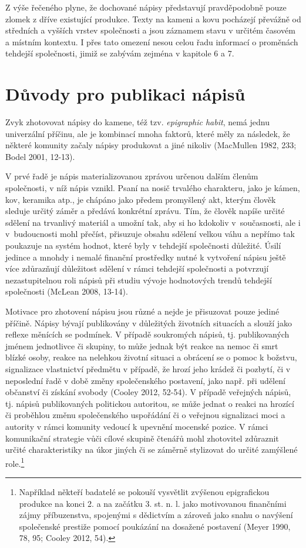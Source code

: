 Z výše řečeného plyne, že dochované nápisy představují pravděpodobně pouze zlomek z dříve existující produkce. Texty na kameni a kovu pocházejí převážně od středních a vyšších vrstev společnosti a jsou záznamem stavu v určitém časovém a místním kontextu. I přes tato omezení nesou celou řadu informací o proměnách tehdejší společnosti, jimiž se zabývám zejména v kapitole 6 a 7.

\section[důvody-pro-publikaci-nápisů]{Důvody pro publikaci nápisů}

Zvyk zhotovovat nápisy do kamene, též tzv. {\em epigraphic habit}, nemá jednu univerzální příčinu, ale je kombinací mnoha faktorů, které měly za následek, že některé komunity začaly nápisy produkovat a jiné nikoliv (MacMullen 1982, 233; Bodel 2001, 12-13).

V prvé řadě je nápis materializovanou zprávou určenou dalším členům společnosti, v níž nápis vznikl. Psaní na nosič trvalého charakteru, jako je kámen, kov, keramika atp., je chápáno jako předem promyšlený akt, kterým člověk sleduje určitý záměr a předává konkrétní zprávu. Tím, že člověk napíše určité sdělení na trvanlivý materiál a umožní tak, aby si ho kdokoliv v~současnosti, ale i v~budoucnosti mohl přečíst, přisuzuje obsahu sdělení velkou váhu a nepřímo tak poukazuje na systém hodnot, které byly v tehdejší společnosti důležité. Úsilí jedince a mnohdy i nemalé finanční prostředky nutné k vytvoření nápisu ještě více zdůrazňují důležitost sdělení v rámci tehdejší společnosti a potvrzují nezastupitelnou roli nápisů při studiu vývoje hodnotových trendů tehdejší společnosti (McLean 2008, 13-14).

Motivace pro zhotovení nápisu jsou různé a nejde je přisuzovat pouze jediné příčině. Nápisy bývají publikovány v důležitých životních situacích a slouží jako reflexe měnících se podmínek. V případě soukromých nápisů, tj. publikovaných jménem jednotlivce či skupiny, to může jednak být reakce na nemoc či smrt blízké osoby, reakce na nelehkou životní situaci a obrácení se o pomoc k božstvu, signalizace vlastnictví předmětu v případě, že hrozí jeho krádež či pozbytí, či v neposlední řadě v době změny společenského postavení, jako např. při udělení občanství či získání svobody (Cooley 2012, 52-54). V případě veřejných nápisů, tj. nápisů publikovaných politickou autoritou, se může jednat o reakci na hrozící či proběhlou změnu společenského uspořádání či o veřejnou signalizaci moci a autority v rámci komunity vedoucí k upevnění mocenské pozice. V rámci komunikační strategie vůči cílové skupině čtenářů mohl zhotovitel zdůraznit určité charakteristiky na úkor jiných či se záměrně stylizovat do určité zamýšlené role.\footnote{Například někteří badatelé se pokouší vysvětlit zvýšenou epigrafickou produkce na konci 2. a na začátku 3. st. n. l. jako motivovanou finančními zájmy příbuzenstva, spojenými s dědictvím a zároveň jako snahu o navýšení společenské prestiže pomocí poukázání na dosažené postavení (Meyer 1990, 78, 95; Cooley 2012, 54).}

